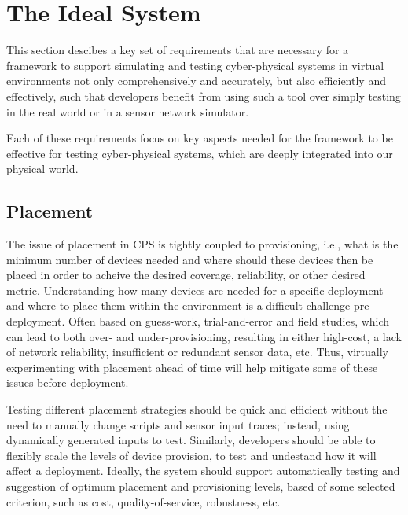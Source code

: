 \section{The Ideal System}
\label{sec:Requirements}
This section descibes a key set of requirements that are necessary for a framework to support simulating and testing cyber-physical systems in virtual environments not only comprehensively and accurately, but also efficiently and effectively, such that developers benefit from using such a tool over simply testing in the real world or in a sensor network simulator.

Each of these requirements focus on key aspects needed for the framework to be effective for testing cyber-physical systems, which are deeply integrated into our physical world.

\subsection{Placement}
\label{sub:requirements_3D design and placement}
The issue of placement in CPS is tightly coupled to provisioning, i.e., what is the minimum number of devices needed and where should these devices then be placed in order to acheive the desired coverage, reliability, or other desired metric. 
Understanding how many devices are needed for a specific deployment and where to place them within the environment is a difficult challenge pre-deployment. Often based on guess-work, trial-and-error and field studies, which can lead to both over- and under-provisioning, resulting in either high-cost, a lack of network reliability, insufficient or redundant sensor data, etc. 
Thus, virtually experimenting with placement ahead of time will help mitigate some of these issues before deployment. 

Testing different placement strategies should be quick and efficient without the need to manually change scripts and sensor input traces; instead, using dynamically generated inputs to test. Similarly, developers should be able to flexibly scale the levels of device provision, to test and undestand how it will affect a deployment. Ideally, the system should support automatically testing and suggestion of optimum placement and provisioning levels, based of some selected criterion, such as cost, quality-of-service, robustness, etc.

